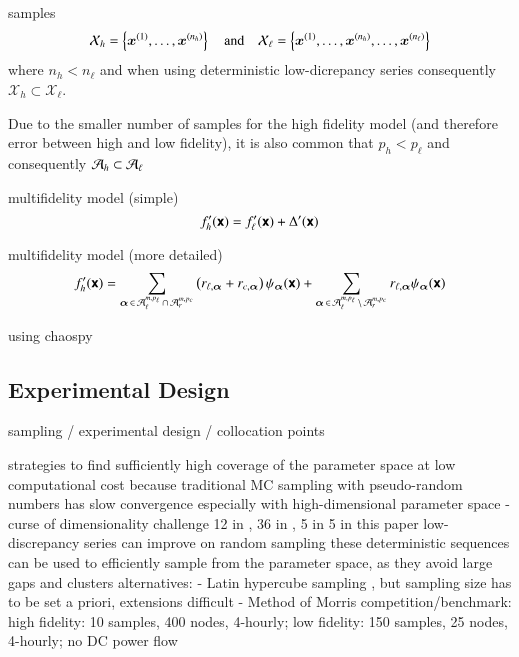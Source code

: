 samples
\begin{equation}
    \mathcal{X}_h = \left\{ \bm{x}^{(1)}, \dots, \bm{x}^{(n_h)}\right\} \quad\text{and}\quad
    \mathcal{X}_\ell = \left\{ \bm{x}^{(1)}, \dots, \bm{x}^{(n_h)}, \dots, \bm{x}^{(n_\ell)}\right\}
\end{equation}
where $n_h < n_\ell$ and when using deterministic low-dicrepancy series
consequently $\mathcal{X}_h \subset \mathcal{X}_\ell$.

Due to the smaller number of samples for the high fidelity model (and therefore error between high and low fidelity), it is also
common that $p_h < p_\ell$ and consequently $\mathcal{A}_h \subset \mathcal{A}_\ell$

multifidelity model (simple)
\begin{equation}
    f_h'(\boldsymbol{\mathsf{x}}) = f_\ell'(\boldsymbol{\mathsf{x}}) + \Delta'(\boldsymbol{\mathsf{x}})
\end{equation}

multifidelity model (more detailed)
\begin{equation}
    f_h' (\boldsymbol{\mathsf{x}}) = \sum_{{\bm{\alpha}}\,\in\,\mathcal{A}_\ell^{m,p_\ell} \,\cap\, \mathcal{A}_r^{m,p_c}}
    \left(
     r_{\ell,{\bm{\alpha}}} + r_{c,{\bm{\alpha}}}
    \right) \psi_{\bm{\alpha}}(\boldsymbol{\mathsf{x}}) + 
    \sum_{{\bm{\alpha}}\,\in\,\mathcal{A}_\ell^{m,p_\ell} \,\setminus\, \mathcal{A}_r^{m,p_c}}
    r_{\ell,{\bm{\alpha}}} \psi_{\bm{\alpha}}(\boldsymbol{\mathsf{x}})
\end{equation}

using chaospy \cite{feinberg_chaospy_2015}

\subsection{Experimental Design}
\label{sec:sampling}


sampling / experimental design / collocation points

strategies to find sufficiently high coverage of the parameter space at low computational cost \cite{fajraoui_optimal_2017,usher_value_2015}
because traditional MC sampling with pseudo-random numbers has slow convergence %
especially with high-dimensional parameter space - curse of dimensionality challenge
12 in \cite{trondle_trade-offs_2020}, 36 in \cite{pilpola_analyzing_2020}, 5 in \cite{shirizadeh_how_2019} 5 in this paper
low-discrepancy series can improve on random sampling
these deterministic sequences can be used to efficiently sample from the parameter space, as they avoid large gaps and clusters \cite{fajraoui_optimal_2017}
alternatives:
- Latin hypercube sampling \cite{trondle_trade-offs_2020}, but sampling size has to be set a priori, extensions difficult \cite{fajraoui_optimal_2017}
- Method of Morris \cite{usher_value_2015,mavromatidis_uncertainty_2018}
competition/benchmark: \cite{trondle_trade-offs_2020} high fidelity: 10 samples, 400 nodes, 4-hourly; low fidelity: 150 samples, 25 nodes, 4-hourly; no DC power flow

